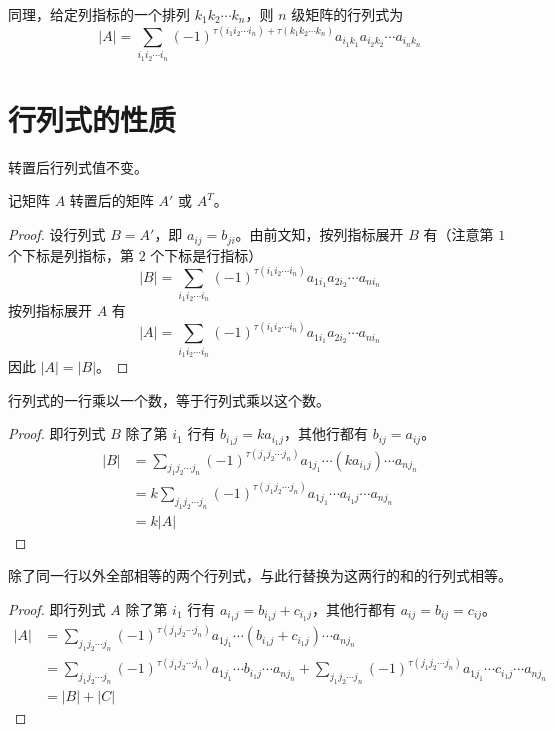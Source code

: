 同理，给定列指标的一个排列 $k_1k_2\cdots k_n$，则 $n$ 级矩阵的行列式为
$$|A| = \sum_{i_1i_2\cdots i_n}(-1)^{\tau(i_1i_2\cdots i_n)+\tau(k_1k_2\cdots k_n)}a_{i_1k_1}a_{i_2k_2}\cdots a_{i_nk_n}$$

\section{行列式的性质}

\begin{theorem}
	转置后行列式值不变。
\end{theorem}

记矩阵 $A$ 转置后的矩阵 $A'$ 或 $A^T$。

\begin{proof}
	设行列式 $B=A'$，即 $a_{ij}=b_{ji}$。由前文知，按列指标展开 $B$ 有（注意第 $1$ 个下标是列指标，第 $2$ 个下标是行指标）
	$$|B|=\sum_{i_1i_2\cdots i_n}(-1)^{\tau(i_1i_2\cdots i_n)}a_{1i_1}a_{2i_2}\cdots a_{ni_n}$$
	按列指标展开 $A$ 有
	$$|A|=\sum_{i_1i_2\cdots i_n}(-1)^{\tau(i_1i_2\cdots i_n)}a_{1i_1}a_{2i_2}\cdots a_{ni_n}$$
	因此 $|A|=|B|$。
\end{proof}

\begin{theorem}
	行列式的一行乘以一个数，等于行列式乘以这个数。
\end{theorem}

\begin{proof}
	即行列式 $B$ 除了第 $i_1$ 行有 $b_{i_1j}=ka_{i_1j}$，其他行都有 $b_{ij}=a_{ij}$。
	\begin{equation*}
		\begin{aligned}
			|B| &= \sum_{j_1j_2\cdots j_n}(-1)^{\tau(j_1j_2\cdots j_n)}a_{1j_1}\cdots (ka_{i_1j}) \cdots a_{nj_n}\\
			&= k\sum_{j_1j_2\cdots j_n}(-1)^{\tau(j_1j_2\cdots j_n)}a_{1j_1}\cdots a_{i_1j} \cdots a_{nj_n}\\
			&=k|A|
		\end{aligned}
	\end{equation*}
\end{proof}

\begin{theorem}
	除了同一行以外全部相等的两个行列式，与此行替换为这两行的和的行列式相等。
\end{theorem}

\begin{proof}
	即行列式 $A$ 除了第 $i_1$ 行有 $a_{i_1j}=b_{i_1j}+c_{i_1j}$，其他行都有 $a_{ij}=b_{ij}=c_{ij}$。
	\begin{equation*}
		\begin{aligned}
			|A| &= \sum_{j_1j_2\cdots j_n}(-1)^{\tau(j_1j_2\cdots j_n)}a_{1j_1}\cdots (b_{i_1j}+c_{i_1j}) \cdots a_{nj_n}\\
			&= \sum_{j_1j_2\cdots j_n}(-1)^{\tau(j_1j_2\cdots j_n)}a_{1j_1}\cdots b_{i_1j} \cdots a_{nj_n}+\sum_{j_1j_2\cdots j_n}(-1)^{\tau(j_1j_2\cdots j_n)}a_{1j_1}\cdots c_{i_1j} \cdots a_{nj_n}\\
			&=|B|+|C|
		\end{aligned}
	\end{equation*}
\end{proof}

